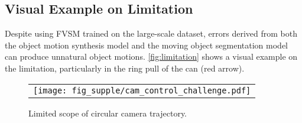 \subsection{Visual Example on Limitation}
Despite using FVSM trained on the large-scale dataset, errors derived from both the object motion synthesis model and the moving object segmentation model can produce unnatural object motions.
\cref{fig:limitation} shows a visual example on the limitation, particularly in the ring pull of the can (red arrow).









\begin{table}[!t]
\centering
{}
\vspace{-3mm}
\caption{
Quantitative comparison on visual consistency using CLIP-Similarity.
}
\vspace{-3mm}
\label{table:clip_similarity}
\end{table}


\begin{figure*}[!t]
\centering
\begin{tabular}{@{}c}
\texttt{[image: fig\_supple/cam\_control\_challenge.pdf]} \\
\end{tabular}
\vspace{-3.5mm}
\caption{
Limited scope of circular camera trajectory.
}
\vspace{-2mm}
\label{fig:cam_control_challenge}
\end{figure*}






